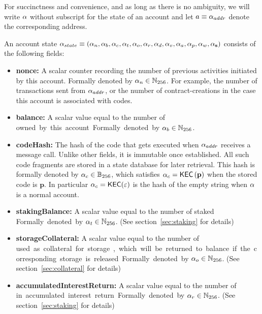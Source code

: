 For succinctness and convenience, and as long as there is no ambiguity, we will write $\mathbf{\alpha}$ without subscript for the state of an account and let $a\equiv \mathbf{\alpha}_{addr}$ denote the corresponding address.

An account state $\mathbf{\alpha}_{state} \equiv\left( \mathbf{\alpha}_n, \mathbf{\alpha}_b, \mathbf{\alpha}_c,\mathbf{\alpha}_t, \mathbf{\alpha}_o, \mathbf{\alpha}_r, \mathbf{\alpha}_d, \mathbf{\alpha}_v, \mathbf{\alpha}_a, \mathbf{\alpha}_p, \mathbf{\alpha}_w , \mathbf{\alpha}_{\bf s}\right)$ consists of the following fields:
\begin{itemize}[nosep]
	\item {\bf nonce:} A scalar counter recording the number of previous activities initiated by this account. Formally denoted by $\mathbf{\alpha}_n\in \mathbb{N}_{256}$. For example, the number of transactions sent from $\mathbf{\alpha}_{addr}$, or the number of contract-creations in the case this account is associated with codes.

	\item {\bf balance:} A scalar value equal to the number of \unit  owned by this account. Formally denoted by $\mathbf{\alpha}_b\in \mathbb{N}_{256}$. 

	\item {\bf codeHash:} The hash of the \cvm code  that gets executed when $\mathbf{\alpha}_{addr}$ receives a message call. 
	Unlike other fields, it is immutable once established. All such code fragments are stored in a state database for later retrieval. This hash is formally denoted by $\mathbf{\alpha}_c\in \mathbb{B}_{256}$,
	which satisfies $\mathbf{\alpha}_c=\mathsf{KEC}\left(\mathbf{p} \right)$ when the stored code is $\mathbf{p}$.  
	In particular $\mathbf{\alpha}_{c} =\mathsf{KEC}(\mathbb{\varepsilon} )$ is the hash of the empty string when $\mathbf{\alpha}$ is a normal account.

	\item {\bf stakingBalance:} A scalar value equal to the number of staked \unit. Formally denoted by $\mathbf{\alpha}_t\in \mathbb{N}_{256}$. (See section~\ref{sec:staking} for details)
	
	\item {\bf storageCollateral:} A scalar value equal to the number of \unit used as collateral for storage, which will be returned to balance if the corresponding storage is released. Formally denoted by $\mathbf{\alpha}_o\in \mathbb{N}_{256}$. (See section~\ref{sec:collateral} for details)
	
	\item {\bf accumulatedInterestReturn:} A scalar value equal to the number of \unit in accumulated interest return. Formally denoted by $\mathbf{\alpha}_r\in \mathbb{N}_{256}$. (See section~\ref{sec:staking} for details)
	

\end{itemize}

